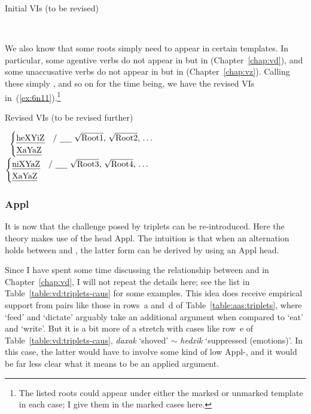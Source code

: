 \begin{exe}
\begin{xlist}
\begin{exe}
\begin{exe}
\begin{xlist}
\begin{exe}
\begin{exe}
\begin{exe}
\begin{exe}
\begin{exe}
\begin{xlist}
\begin{exe}
 \begin{exe}
 \ex  \label{ex:6n10}Initial VIs (to be revised) 
 \begin{xlist} 
 	\ex  {\vds} \lra~{\thif} 
 	\ex  {\vzs} \lra~{\tnif} 
 \z
\z 

We also know that some roots simply need to appear in certain templates. In particular, some agentive verbs do not appear in {\thif} but in {\tkal} (Chapter~\ref{chap:vd}), and some unaccusative verbs do not appear in {\tnif} but in {\tkal} (Chapter~\ref{chap:vz}). Calling these simply ,  and so on for the time being, we have the revised VIs in~(\ref{ex:6n11}).\footnote{The listed roots could appear under either the marked or unmarked template in each case; I give them in the marked cases here.}

 \begin{exe}
 \ex  \label{ex:6n11}Revised VIs (to be revised further) 
 \begin{xlist} 
 	\ex  {\vds} \lra~$\begin{cases} 
		\text{\thif} & \text{/ \trace~\root{Root1}, \root{Root2}, \dots}\\
		\text{\tkal} & \\
		\end{cases}$
 	\ex  {\vzs} \lra~$\begin{cases} 
		\text{\tnif} & \text{/ \trace~\root{Root3}, \root{Root4}, \dots}\\
		\text{\tkal} & \\
		\end{cases}$
 \z
\z 


		\subsubsection{Appl}
It is now that the challenge posed by triplets can be re-introduced. Here the theory makes use of the  head Appl. The intuition is that when an alternation holds between {\tkal} and {\thif}, the latter form can be derived by using an Appl head.

Since I have spent some time discussing the relationship between {\tkal} and {\thif} in Chapter~\ref{chap:vd}, I will not repeat the details here; see the list in Table~\ref{table:vd:triplets-caus} for some examples. This idea does receive empirical support from pairs like those in rows~a and~d of Table~\ref{table:aas:triplets}, where `feed' and `dictate' arguably take an additional argument when compared to `eat' and `write'. But it is a bit more of a stretch with cases like row~e of Table~\ref{table:vd:triplets-caus}, \emph{daxak} `shoved' $\sim$ \emph{hedxik} `suppressed (emotions)'. In this case, the latter would have to involve some kind of low Appl-, and it would be far less clear what it means to be an applied argument.


\end{xlist}
\end{exe}
\end{xlist}
\end{exe}
\end{exe}
\end{xlist}
\end{exe}
\end{exe}
\end{exe}
\end{exe}
\end{exe}
\end{xlist}
\end{exe}
\end{exe}
\end{xlist}
\end{exe}
